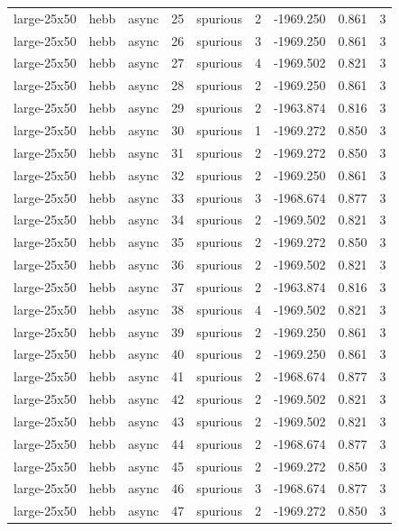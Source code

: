 \begin{tabular}{lllrlrrrr}
large-25x50 & hebb & async & 25 & spurious & 2 & -1969.250 & 0.861 & 3 \\
large-25x50 & hebb & async & 26 & spurious & 3 & -1969.250 & 0.861 & 3 \\
large-25x50 & hebb & async & 27 & spurious & 4 & -1969.502 & 0.821 & 3 \\
large-25x50 & hebb & async & 28 & spurious & 2 & -1969.250 & 0.861 & 3 \\
large-25x50 & hebb & async & 29 & spurious & 2 & -1963.874 & 0.816 & 3 \\
large-25x50 & hebb & async & 30 & spurious & 1 & -1969.272 & 0.850 & 3 \\
large-25x50 & hebb & async & 31 & spurious & 2 & -1969.272 & 0.850 & 3 \\
large-25x50 & hebb & async & 32 & spurious & 2 & -1969.250 & 0.861 & 3 \\
large-25x50 & hebb & async & 33 & spurious & 3 & -1968.674 & 0.877 & 3 \\
large-25x50 & hebb & async & 34 & spurious & 2 & -1969.502 & 0.821 & 3 \\
large-25x50 & hebb & async & 35 & spurious & 2 & -1969.272 & 0.850 & 3 \\
large-25x50 & hebb & async & 36 & spurious & 2 & -1969.502 & 0.821 & 3 \\
large-25x50 & hebb & async & 37 & spurious & 2 & -1963.874 & 0.816 & 3 \\
large-25x50 & hebb & async & 38 & spurious & 4 & -1969.502 & 0.821 & 3 \\
large-25x50 & hebb & async & 39 & spurious & 2 & -1969.250 & 0.861 & 3 \\
large-25x50 & hebb & async & 40 & spurious & 2 & -1969.250 & 0.861 & 3 \\
large-25x50 & hebb & async & 41 & spurious & 2 & -1968.674 & 0.877 & 3 \\
large-25x50 & hebb & async & 42 & spurious & 2 & -1969.502 & 0.821 & 3 \\
large-25x50 & hebb & async & 43 & spurious & 2 & -1969.502 & 0.821 & 3 \\
large-25x50 & hebb & async & 44 & spurious & 2 & -1968.674 & 0.877 & 3 \\
large-25x50 & hebb & async & 45 & spurious & 2 & -1969.272 & 0.850 & 3 \\
large-25x50 & hebb & async & 46 & spurious & 3 & -1968.674 & 0.877 & 3 \\
large-25x50 & hebb & async & 47 & spurious & 2 & -1969.272 & 0.850 & 3 \\

\end{tabular}
